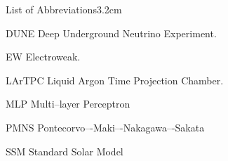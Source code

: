 
\begin{mclistof}{List of Abbreviations}{3.2cm}

\item[DUNE] Deep Underground Neutrino Experiment. 

\item[EW] Electroweak.

\item[LArTPC] Liquid Argon Time Projection Chamber. 

\item[MLP] Multi--layer Perceptron

\item[PMNS] Pontecorvo–-Maki–-Nakagawa–-Sakata

\item[SSM] Standard Solar Model

\end{mclistof} 
